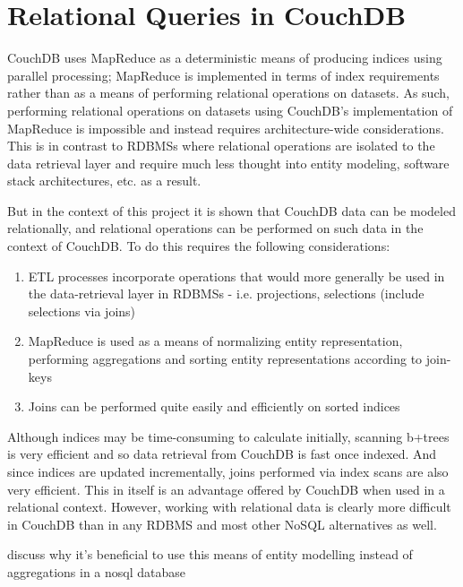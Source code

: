 \section{Relational Queries in CouchDB}
CouchDB uses MapReduce as a deterministic means of producing indices using parallel processing; MapReduce is implemented in terms of index requirements rather than as a means of performing relational operations on datasets. As such, performing relational operations on datasets using CouchDB's implementation of MapReduce is impossible and instead requires architecture-wide considerations. This is in contrast to RDBMSs where relational operations are isolated to the data retrieval layer and require much less thought into entity modeling, software stack architectures, etc. as a result.

But in the context of this project it is shown that CouchDB data can be modeled relationally, and relational operations can be performed on such data in the context of CouchDB. To do this requires the following considerations:

\begin{enumerate}
    \item ETL processes incorporate operations that would more generally be used in the data-retrieval layer in RDBMSs - i.e. projections, selections (include selections via joins)
    \item MapReduce is used as a means of normalizing entity representation, performing aggregations and sorting entity representations according to join-keys
    \item Joins can be performed quite easily and efficiently on sorted indices
\end{enumerate}

Although indices may be time-consuming to calculate initially, scanning b+trees is very efficient and so data retrieval from CouchDB is fast once indexed. And since indices are updated incrementally, joins performed via index scans are also very efficient. This in itself is an advantage offered by CouchDB when used in a relational context. However, working with relational data is clearly more difficult in CouchDB than in any RDBMS and most other NoSQL alternatives as well.

discuss why it's beneficial to use this means of entity modelling instead of aggregations in a nosql database